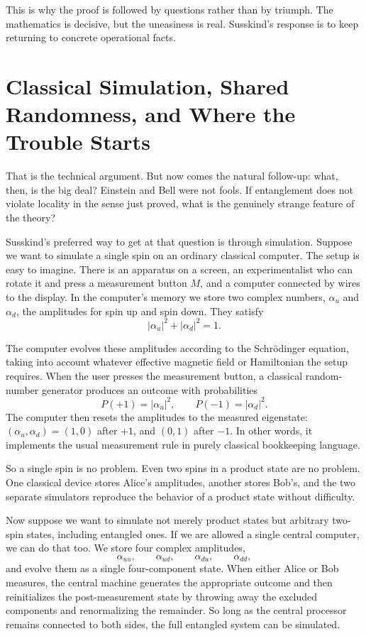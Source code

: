 This is why the proof is followed by questions rather than by triumph. The mathematics is decisive, but the uneasiness is real. Susskind's response is to keep returning to concrete operational facts.

\section{Classical Simulation, Shared Randomness, and Where the Trouble Starts}

That is the technical argument. But now comes the natural follow-up: what, then, is the big deal? Einstein and Bell were not fools. If entanglement does not violate locality in the sense just proved, what is the genuinely strange feature of the theory?

Susskind's preferred way to get at that question is through simulation. Suppose we want to simulate a single spin on an ordinary classical computer. The setup is easy to imagine. There is an apparatus on a screen, an experimentalist who can rotate it and press a measurement button \(M\), and a computer connected by wires to the display. In the computer's memory we store two complex numbers, \(\alpha_u\) and \(\alpha_d\), the amplitudes for spin up and spin down. They satisfy
\begin{equation}
|\alpha_u|^2+|\alpha_d|^2=1.
\end{equation}

The computer evolves these amplitudes according to the Schr\"odinger equation, taking into account whatever effective magnetic field or Hamiltonian the setup requires. When the user presses the measurement button, a classical random-number generator produces an outcome with probabilities
\begin{equation}
P(+1)=|\alpha_u|^2,\qquad P(-1)=|\alpha_d|^2.
\end{equation}
The computer then resets the amplitudes to the measured eigenstate: \((\alpha_u,\alpha_d)=(1,0)\) after \(+1\), and \((0,1)\) after \(-1\). In other words, it implements the usual measurement rule in purely classical bookkeeping language.

So a single spin is no problem. Even two spins in a product state are no problem. One classical device stores Alice's amplitudes, another stores Bob's, and the two separate simulators reproduce the behavior of a product state without difficulty.

Now suppose we want to simulate not merely product states but arbitrary two-spin states, including entangled ones. If we are allowed a single central computer, we can do that too. We store four complex amplitudes,
\begin{equation}
\alpha_{uu},\qquad \alpha_{ud},\qquad \alpha_{du},\qquad \alpha_{dd},
\end{equation}
and evolve them as a single four-component state. When either Alice or Bob measures, the central machine generates the appropriate outcome and then reinitializes the post-measurement state by throwing away the excluded components and renormalizing the remainder. So long as the central processor remains connected to both sides, the full entangled system can be simulated.

